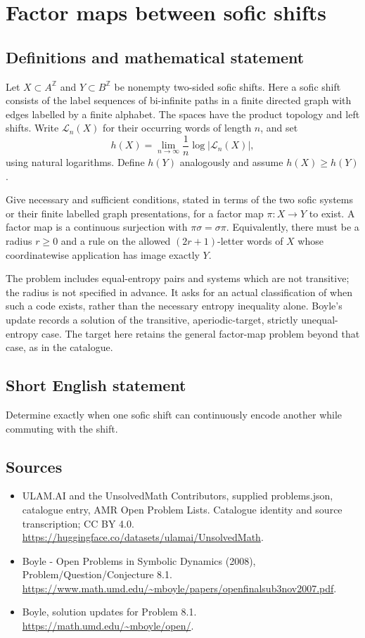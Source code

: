 \documentclass[11pt,a4paper]{article}
\begin{document}
\section*{Factor maps between sofic shifts}\label{statement}

\subsection{Definitions and mathematical statement}
Let $X\subset A^{\mathbb Z}$ and $Y\subset B^{\mathbb Z}$ be nonempty
two-sided sofic shifts. Here a sofic shift consists of the label sequences
of bi-infinite paths in a finite directed graph with edges labelled by a
finite alphabet. The spaces have the product topology and left shifts.
Write $\mathcal L_n(X)$ for their occurring words of length $n$, and set
\[
 h(X)=\lim_{n\to\infty}\frac1n\log|\mathcal L_n(X)|,
\]
using natural logarithms. Define $h(Y)$ analogously and assume $h(X)\ge h(Y)$.

Give necessary and sufficient conditions, stated in terms of the two sofic
systems or their finite labelled graph presentations, for a factor map
$\pi:X\to Y$ to exist. A factor map is a continuous surjection with
$\pi\sigma=\sigma\pi$. Equivalently, there must be a radius $r\ge0$ and
a rule on the allowed $(2r+1)$-letter words of $X$ whose coordinatewise
application has image exactly $Y$.

The problem includes equal-entropy pairs and systems which are not transitive;
the radius is not specified in advance. It asks for an actual classification
of when such a code exists, rather than the necessary entropy inequality
alone. Boyle's update records a solution of the transitive, aperiodic-target,
strictly unequal-entropy case. The target here retains the general factor-map
problem beyond that case, as in the catalogue.
\subsection{Short English statement}
Determine exactly when one sofic shift can continuously encode another while commuting with the shift.
\subsection{Sources}
\begin{itemize}
\item[S1] ULAM.AI and the UnsolvedMath Contributors, supplied problems.json, catalogue entry, AMR Open Problem Lists. Catalogue identity and source transcription; CC BY 4.0.
\url{https://huggingface.co/datasets/ulamai/UnsolvedMath}.
\item[S2] Boyle - Open Problems in Symbolic Dynamics (2008), Problem/Question/Conjecture 8.1. 
\url{https://www.math.umd.edu/~mboyle/papers/openfinalsub3nov2007.pdf}.
\item[S3] Boyle, solution updates for Problem 8.1.
\url{https://math.umd.edu/~mboyle/open/}.
\end{itemize}
\end{document}
